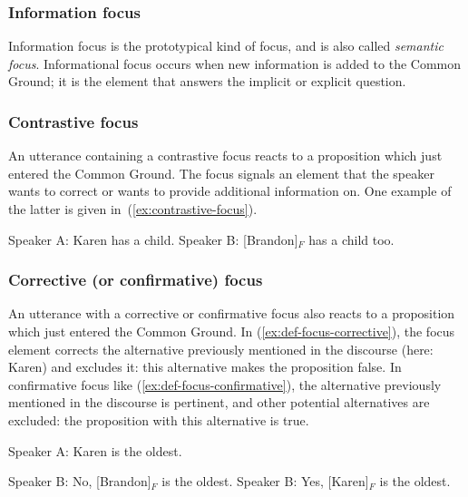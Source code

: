 \subsubsection{Information focus}

Information focus is the prototypical kind of focus, and is also called \emph{semantic focus}. Informational focus occurs when new information is added to the Common Ground; it is the element that answers the implicit or explicit question. 


\subsubsection{Contrastive focus}
An utterance containing a contrastive focus reacts to a proposition which just entered the Common Ground. The focus signals an element that the speaker wants to correct or wants to provide additional information on. One example of the latter is given in~(\ref{ex:contrastive-focus}).

\eal \label{ex:contrastive-focus}
\ex Speaker A: Karen has a child.
\ex Speaker B: [Brandon]$_F$ has a child too.
\zl 

\subsubsection{Corrective (or confirmative) focus} An utterance with a corrective or confirmative focus also reacts to a proposition which just entered the Common Ground. In (\ref{ex:def-focus-corrective}), the focus element corrects the alternative previously mentioned in the discourse (here: Karen) and excludes it: this alternative makes the proposition false. In confirmative focus like (\ref{ex:def-focus-confirmative}), the alternative previously mentioned in the discourse is pertinent, and other potential alternatives are excluded: the proposition with this alternative is true.

\begin{exe}
\ex Speaker A: Karen is the oldest.
\begin{xlist}
\ex Speaker B: No, [Brandon]$_F$ is the oldest. \label{ex:def-focus-corrective}
\ex Speaker B: Yes, [Karen]$_F$ is the oldest. \label{ex:def-focus-confirmative}
\end{xlist}
\end{exe}

